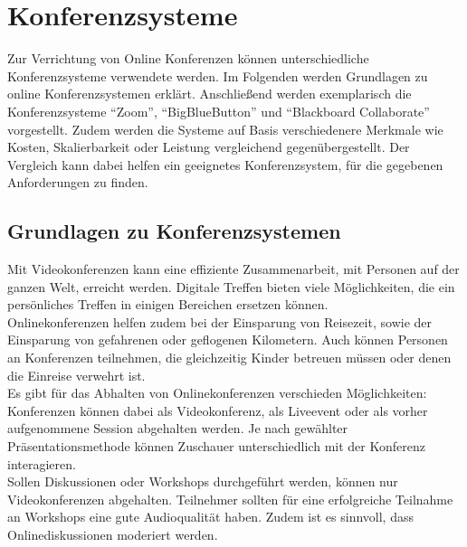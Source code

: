 \chapter{Konferenzsysteme}
Zur Verrichtung von Online Konferenzen können unterschiedliche Konferenzsysteme verwendete werden.
Im Folgenden werden Grundlagen zu online Konferenzsystemen erklärt.
Anschließend werden exemplarisch die Konferenzsysteme \enquote{Zoom}, \enquote{BigBlueButton} und \enquote{Blackboard Collaborate} vorgestellt.
Zudem werden die Systeme auf Basis verschiedenere Merkmale wie Kosten, Skalierbarkeit oder Leistung vergleichend gegenübergestellt.
Der Vergleich kann dabei helfen ein geeignetes Konferenzsystem, für die gegebenen Anforderungen zu finden.

\section{Grundlagen zu Konferenzsystemen}
Mit Videokonferenzen kann eine effiziente Zusammenarbeit, mit Personen auf der ganzen Welt, erreicht werden.
Digitale Treffen bieten viele Möglichkeiten, die ein persönliches Treffen in einigen Bereichen ersetzen können.
\autocite[Vgl.][]{M_Mierke.2020}
\\
Onlinekonferenzen helfen zudem bei der Einsparung von Reisezeit, sowie der Einsparung von gefahrenen oder geflogenen Kilometern.
Auch können Personen an Konferenzen teilnehmen, die gleichzeitig Kinder betreuen müssen oder denen die Einreise verwehrt ist.
\autocite[Vgl.][]{M_Sladek.2020}
\\
Es gibt für das Abhalten von Onlinekonferenzen verschieden Möglichkeiten:\\
Konferenzen können dabei als Videokonferenz, als Liveevent oder als vorher aufgenommene Session abgehalten werden.
Je nach gewählter Präsentationsmethode können Zuschauer unterschiedlich mit der Konferenz interagieren.
\autocite[Vgl.][]{M_Sladek.2020}
\\
Sollen Diskussionen oder Workshops durchgeführt werden, können nur Videokonferenzen abgehalten.
Teilnehmer sollten für eine erfolgreiche Teilnahme an Workshops eine gute Audioqualität haben.
Zudem ist es sinnvoll, dass Onlinediskussionen moderiert werden.
